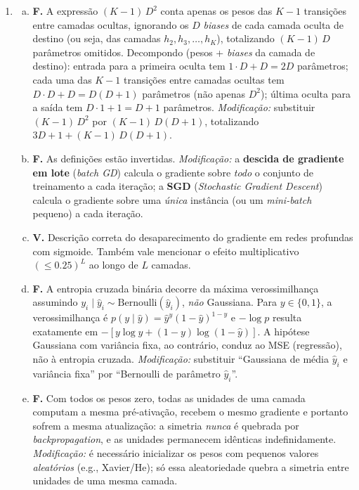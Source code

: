 \documentclass{dlproblemset}
\begin{document}
\begin{enumerate}[1)]
    \item
    \begin{enumerate}[a)]
        \item \textbf{F.} A expressão $(K - 1)\,D^2$ conta apenas os pesos das $K - 1$ transições entre camadas ocultas, ignorando os $D$ \textit{biases} de cada camada oculta de destino (ou seja, das camadas $h_2, h_3, \ldots, h_K$), totalizando $(K - 1)\,D$ parâmetros omitidos. Decompondo (pesos + \textit{biases} da camada de destino): entrada para a primeira oculta tem $1 \cdot D + D = 2D$ parâmetros; cada uma das $K - 1$ transições entre camadas ocultas tem $D \cdot D + D = D(D+1)$ parâmetros (não apenas $D^2$); última oculta para a saída tem $D \cdot 1 + 1 = D + 1$ parâmetros. \textit{Modificação:} substituir $(K - 1)\,D^2$ por $(K - 1)\,D(D+1)$, totalizando $3D + 1 + (K - 1)\,D(D+1)$.
        \item \textbf{F.} As definições estão invertidas. \textit{Modificação:} a \textbf{descida de gradiente em lote} (\textit{batch GD}) calcula o gradiente sobre \emph{todo} o conjunto de treinamento a cada iteração; a \textbf{SGD} (\textit{Stochastic Gradient Descent}) calcula o gradiente sobre uma \emph{única} instância (ou um \textit{mini-batch} pequeno) a cada iteração.
        \item \textbf{V.} Descrição correta do desaparecimento do gradiente em redes profundas com sigmoide. Também vale mencionar o efeito multiplicativo $(\le 0.25)^L$ ao longo de $L$ camadas.
        \item \textbf{F.} A entropia cruzada binária decorre da máxima verossimilhança assumindo $y_i \mid \hat{y}_i \sim \mathrm{Bernoulli}(\hat{y}_i)$, \emph{não} Gaussiana. Para $y \in \{0,1\}$, a verossimilhança é $p(y \mid \hat{y}) = \hat{y}^{y}(1-\hat{y})^{1-y}$ e $-\log p$ resulta exatamente em $-[y\log \hat{y} + (1-y)\log(1-\hat{y})]$. A hipótese Gaussiana com variância fixa, ao contrário, conduz ao MSE (regressão), não à entropia cruzada. \textit{Modificação:} substituir ``Gaussiana de média $\hat{y}_i$ e variância fixa'' por ``Bernoulli de parâmetro $\hat{y}_i$''.
        \item \textbf{F.} Com todos os pesos zero, todas as unidades de uma camada computam a mesma pré-ativação, recebem o mesmo gradiente e portanto sofrem a mesma atualização: a simetria \emph{nunca} é quebrada por \textit{backpropagation}, e as unidades permanecem idênticas indefinidamente. \textit{Modificação:} é necessário inicializar os pesos com pequenos valores \emph{aleatórios} (e.g., Xavier/He); só essa aleatoriedade quebra a simetria entre unidades de uma mesma camada.
    \end{enumerate}


\end{enumerate}
\end{document}
